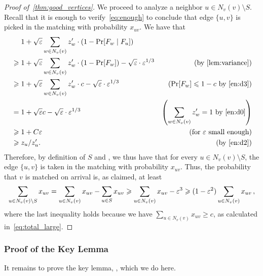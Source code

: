 \begin{proof}[Proof of~\cref{thm:good_vertices}]
	We proceed to analyze a neighbor $u\in N_v(v) \setminus S$.  Recall that it is enough to verify~\eqref{eq:enough} to  conclude that edge $\{u,v\}$ is picked in the matching with probability $x_{uv}$. We have that
	\begin{align*}
	& ~~~~ 1 + \sqrt{\varepsilon} \sum_{w\in N_v(v)} z'_w \cdot (1-\Pr[F_w \mid F_u]) \\
	& \geq 1 + \sqrt{\varepsilon} \sum_{w\in N_v(v)} z'_w \cdot (1-\Pr[F_w]) -  \sqrt{\eps}\cdot\eps^{1/3} & \mbox{(by~\cref{lem:variance})}\\
	& \geq 1 + \sqrt{\varepsilon} \sum_{w\in N_v(v)} z'_w \cdot c -  \sqrt{\eps}\cdot\eps^{1/3} & \mbox{($\Pr[F_w] \leq 1- c$ by~\eqref{en:d3})}\\	
	& = 1 + \sqrt{\varepsilon} c - \sqrt{\eps}\cdot\eps^{1/3}  & \left(\sum_{w\in N_v(v)} z'_w = 1 \text{ by \eqref{en:d0}}\right)\\
	& \geq 1 + C \eps  & \left(\mbox{for $\eps$ small enough}\right)\\
	& \geq z_u/z'_u. & \left(\mbox{by \eqref{en:d2}}\right)
	\end{align*}
	Therefore, by definition of $S$ and , we thus have that for every $u\in N_{v}(v)\setminus S$, the edge $\{u,v\}$ is taken in the matching with probability $x_{uv}$. Thus, the probability that $v$ is matched on arrival is, as claimed, at least
	\begin{align*}
	\sum_{u \in N_v(v) \setminus S} x_{uv}
	= \sum_{u\in N_v(v)} x_{uv} - \sum_{u\in S} x_{uv}
	\geqslant \sum_{u\in N_v(v)} x_{uv} - \varepsilon^3  
	\geqslant (1-\varepsilon^2) \sum_{u\in N_v(v)} x_{uv}\,,
	\end{align*}
	where the last inequality holds because  we have $\sum_{u\in N_v(v)} x_{uv} \geq c$, as calculated in~\eqref{eq:total_large}. 
\end{proof}

\subsubsection{Proof of the Key Lemma}
It remains to prove the key lemma, , which we do here.

